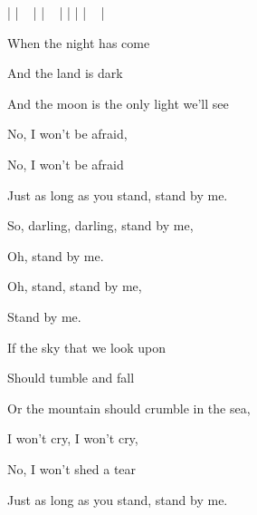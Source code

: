 

\ifdefined\TPBAND
	|  | ~ |   | ~ |   |   |   | ~ |
\fi

\zs
When the night has come

And the land is dark

And the moon is the only light we'll see

No, I won't be afraid,

No, I won't be afraid

Just as long as you stand, stand by me.
\ks

\zr
So, darling, darling, stand by me,

Oh, stand by me.

Oh, stand, stand by me,

Stand by me.
\kr

\zs
  If the sky that we look upon

  Should tumble and fall

  Or the mountain should crumble in the sea,

  I won't cry, I won't cry,

  No, I won't shed a tear

  Just as long as you stand, stand by me.
\ks

\kp
